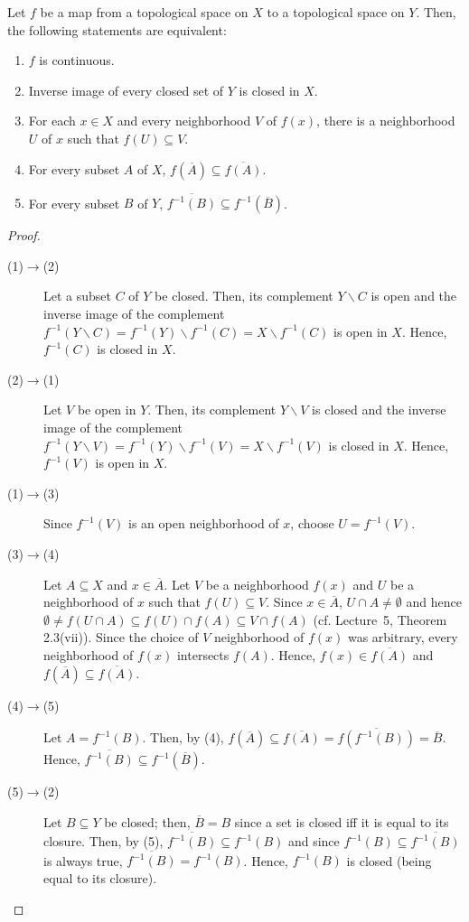 \documentclass[a4paper,english,12pt]{article}
\begin{document}
\begin{thm}
Let $f$ be a map from a topological space on $X$ to a topological space on $Y$. Then, the following statements are equivalent:
\begin{enumerate}
\item $f$ is continuous.
\item Inverse image of every closed set of $Y$ is closed in $X$.
\item For each $x\in X$ and every neighborhood $V$ of $f(x)$, there is a neighborhood $U$ of $x$ such that $f(U)\subseteq V$.
\item For every subset $A$ of $X$, $f(\overline{A})\subseteq \overline{f(A)}$.
\item For every subset $B$ of $Y$, $\overline{f^{-1}(B)}\subseteq f^{-1}(\overline{B})$.
\end{enumerate}
\end{thm}
\begin{proof}
\begin{description}
\item[(1)$\to$(2)]Let a subset $C$ of $Y$ be closed. Then, its complement $Y\backslash C$ is open and the inverse image of the complement $f^{-1}(Y\backslash C)=f^{-1}(Y)\backslash f^{-1}(C)=X\backslash f^{-1}(C)$ is open in $X$. Hence, $f^{-1}(C)$ is closed in $X$.
\item[(2)$\to$(1)]Let $V$ be open in $Y$. Then, its complement $Y\backslash V$ is closed and the inverse image of the complement $f^{-1}(Y\backslash V)=f^{-1}(Y)\backslash f^{-1}(V)=X\backslash f^{-1}(V)$ is closed in $X$. Hence, $f^{-1}(V)$ is open in $X$.
\item[(1)$\to$(3)]Since $f^{-1}(V)$ is an open neighborhood of $x$, choose $U=f^{-1}(V)$.
\item[(3)$\to$(4)]Let $A\subseteq X$ and $x\in \overline{A}$. Let $V$ be a neighborhood $f(x)$ and $U$ be a neighborhood of $x$ such that $f(U)\subseteq V$. Since $x\in \overline{A}$, $U\cap A\neq \emptyset$ and hence $\emptyset\neq f(U\cap A)\subseteq f(U)\cap f(A)\subseteq V\cap f(A)$ (cf. Lecture~5, Theorem 2.3(vii)). Since the choice of $V$ neighborhood of $f(x)$ was arbitrary, every neighborhood of $f(x)$ intersects $f(A)$. Hence, $f(x)\in \overline{f(A)}$ and $f(\overline{A})\subseteq \overline{f(A)}$.
\item[(4)$\to$(5)]Let $A=f^{-1}(B)$. Then, by (4), $f(\overline{A})\subseteq \overline{f(A)}=\overline{f(f^{-1}(B))}=\overline{B}$. Hence, $\overline{f^{-1}(B)}\subseteq f^{-1}(\overline{B})$.
\item[(5)$\to$(2)]Let $B\subseteq Y$ be closed; then, $\overline{B}=B$ since a set is closed iff it is equal to its closure. Then, by (5), $\overline{f^{-1}(B)}\subseteq f^{-1}(B)$ and since $f^{-1}(B)\subseteq \overline{f^{-1}(B)}$ is always true, $\overline{f^{-1}(B)}=f^{-1}(B)$. Hence, $f^{-1}(B)$ is closed (being equal to its closure).
\end{description}

\end{proof}
\end{document}
